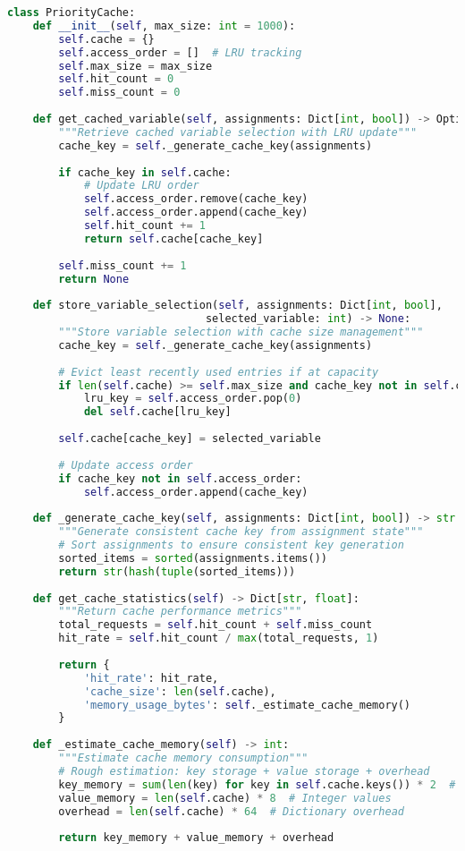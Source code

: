 \begin{lstlisting}[language=Python, caption=Priority Cache Implementation with Memory Management]
class PriorityCache:
    def __init__(self, max_size: int = 1000):
        self.cache = {}
        self.access_order = []  # LRU tracking
        self.max_size = max_size
        self.hit_count = 0
        self.miss_count = 0
    
    def get_cached_variable(self, assignments: Dict[int, bool]) -> Optional[int]:
        """Retrieve cached variable selection with LRU update"""
        cache_key = self._generate_cache_key(assignments)
        
        if cache_key in self.cache:
            # Update LRU order
            self.access_order.remove(cache_key)
            self.access_order.append(cache_key)
            self.hit_count += 1
            return self.cache[cache_key]
        
        self.miss_count += 1
        return None
    
    def store_variable_selection(self, assignments: Dict[int, bool], 
                               selected_variable: int) -> None:
        """Store variable selection with cache size management"""
        cache_key = self._generate_cache_key(assignments)
        
        # Evict least recently used entries if at capacity
        if len(self.cache) >= self.max_size and cache_key not in self.cache:
            lru_key = self.access_order.pop(0)
            del self.cache[lru_key]
        
        self.cache[cache_key] = selected_variable
        
        # Update access order
        if cache_key not in self.access_order:
            self.access_order.append(cache_key)
    
    def _generate_cache_key(self, assignments: Dict[int, bool]) -> str:
        """Generate consistent cache key from assignment state"""
        # Sort assignments to ensure consistent key generation
        sorted_items = sorted(assignments.items())
        return str(hash(tuple(sorted_items)))
    
    def get_cache_statistics(self) -> Dict[str, float]:
        """Return cache performance metrics"""
        total_requests = self.hit_count + self.miss_count
        hit_rate = self.hit_count / max(total_requests, 1)
        
        return {
            'hit_rate': hit_rate,
            'cache_size': len(self.cache),
            'memory_usage_bytes': self._estimate_cache_memory()
        }
    
    def _estimate_cache_memory(self) -> int:
        """Estimate cache memory consumption"""
        # Rough estimation: key storage + value storage + overhead
        key_memory = sum(len(key) for key in self.cache.keys()) * 2  # Unicode
        value_memory = len(self.cache) * 8  # Integer values
        overhead = len(self.cache) * 64  # Dictionary overhead
        
        return key_memory + value_memory + overhead
\end{lstlisting}

